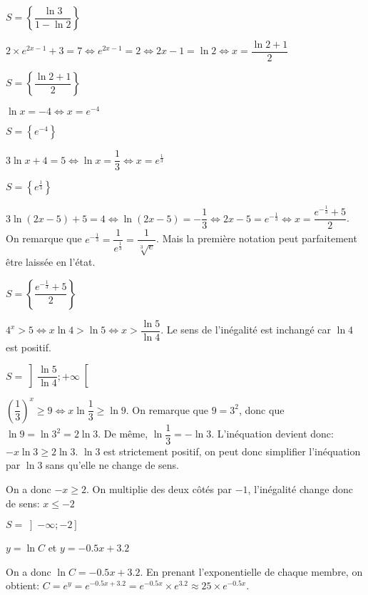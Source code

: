 \documentclass[a4paper,12pt]{scrartcl}
\begin{document}
$S = \left\lbrace \dfrac{\ln 3}{1-\ln 2} \right\rbrace$

\question{}
$2 \times e^{2x-1} + 3 = 7 \Leftrightarrow e^{2x-1} = 2 \Leftrightarrow 2x-1 = \ln 2 \Leftrightarrow x = \dfrac{\ln 2 + 1}{2}$

$S = \left\lbrace \dfrac{\ln 2 + 1}{2} \right\rbrace$


\question{}
$\ln x = -4 \Leftrightarrow x = e^{-4}$

$S = \left\lbrace e^{-4} \right\rbrace$

\question{}
$3 \ln x + 4  = 5 \Leftrightarrow \ln x = \dfrac{1}{3} \Leftrightarrow x = e^{\frac{1}{3}}$

$S = \left\lbrace e^{\frac{1}{3}} \right\rbrace$

\question{}
$3 \ln(2x-5)+5 = 4 \Leftrightarrow \ln(2x-5) = -\dfrac{1}{3} \Leftrightarrow 2x-5 = e^{-\frac{1}{3}} \Leftrightarrow x = \dfrac{e^{-\frac{1}{3}} + 5}{2}$. On remarque que $e^{-\frac{1}{3}} = \dfrac{1}{e^{\frac{1}{3}}} = \dfrac{1}{\sqrt[3]{e}}$. Mais la première notation peut parfaitement être laissée en l'état.

$S = \left\lbrace \dfrac{e^{-\frac{1}{3}} + 5}{2} \right\rbrace$


\question{}
$4^x > 5 \Leftrightarrow x \ln 4 > \ln 5 \Leftrightarrow x > \dfrac{\ln 5}{\ln 4}$. Le sens de l'inégalité est inchangé car $\ln 4$ est positif.

$S = \left] \dfrac{\ln 5}{\ln 4} ; +\infty \right[$

\question{}
$\left( \dfrac{1}{3} \right)^x \geqslant 9 \Leftrightarrow x \ln \dfrac{1}{3} \geqslant \ln 9$. On remarque que $9 = 3^2$, donc que $\ln 9 = \ln 3^2 = 2 \ln 3$. De même, $\ln \dfrac{1}{3} = -\ln 3$. L'inéquation devient donc: $-x \ln 3 \geqslant 2 \ln 3$. $\ln 3$ est strictement positif, on peut donc simplifier l'inéquation par $\ln 3$ sans qu'elle ne change de sens. 

On a donc $-x \geqslant 2$. On multiplie des deux côtés par $-1$, l'inégalité change donc de sens: $x \leqslant -2$

$S = \left] -\infty ; -2 \right]$

\exo{}
$y = \ln C$ et $y= -0.5x +3.2$

\question{}
On a donc $\ln C = -0.5x +3.2$. En prenant l'exponentielle de chaque membre, on obtient: $C = e^y = e^{-0.5x +3.2} = e^{-0.5x} \times e^{3.2} \approx 25 \times e^{-0.5x}$.
\end{document}
